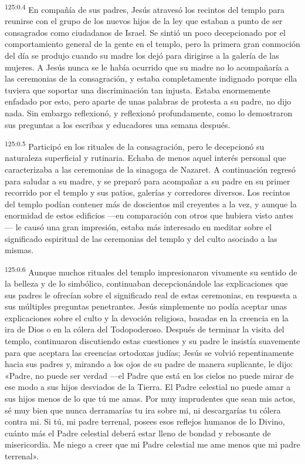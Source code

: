 \par 
\textsuperscript{125:0.4} En compañía de sus padres, Jesús atravesó los recintos del templo para reunirse con el grupo de los nuevos hijos de la ley que estaban a punto de ser consagrados como ciudadanos de Israel. Se sintió un poco decepcionado por el comportamiento general de la gente en el templo, pero la primera gran conmoción del día se produjo cuando su madre los dejó para dirigirse a la galería de las mujeres. A Jesús nunca se le había ocurrido que su madre no lo acompañaría a las ceremonias de la consagración, y estaba completamente indignado porque ella tuviera que soportar una discriminación tan injusta. Estaba enormemente enfadado por esto, pero aparte de unas palabras de protesta a su padre, no dijo nada. Sin embargo reflexionó, y reflexionó profundamente, como lo demostraron sus preguntas a los escribas y educadores una semana después.

\par 
\textsuperscript{125:0.5} Participó en los rituales de la consagración, pero le decepcionó su naturaleza superficial y rutinaria. Echaba de menos aquel interés personal que caracterizaba a las ceremonias de la sinagoga de Nazaret. A continuación regresó para saludar a su madre, y se preparó para acompañar a su padre en su primer recorrido por el templo y sus patios, galerías y corredores diversos. Los recintos del templo podían contener más de doscientos mil creyentes a la vez, y aunque la enormidad de estos edificios ---en comparación con otros que hubiera visto antes--- le causó una gran impresión, estaba más interesado en meditar sobre el significado espiritual de las ceremonias del templo y del culto asociado a las mismas.

\par 
\textsuperscript{125:0.6} Aunque muchos rituales del templo impresionaron vivamente su sentido de la belleza y de lo simbólico, continuaban decepcionándole las explicaciones que sus padres le ofrecían sobre el significado real de estas ceremonias, en respuesta a sus múltiples preguntas penetrantes. Jesús simplemente no podía aceptar unas explicaciones sobre el culto y la devoción religiosa, basadas en la creencia en la ira de Dios o en la cólera del Todopoderoso. Después de terminar la visita del templo, continuaron discutiendo estas cuestiones y su padre le insistía suavemente para que aceptara las creencias ortodoxas judías; Jesús se volvió repentinamente hacia sus padres y, mirando a los ojos de su padre de manera suplicante, le dijo: «Padre, no puede ser verdad ---el Padre que está en los cielos no puede mirar de ese modo a sus hijos desviados de la Tierra. El Padre celestial no puede amar a sus hijos menos de lo que tú me amas. Por muy imprudentes que sean mis actos, sé muy bien que nunca derramarías tu ira sobre mi, ni descargarías tu cólera contra mi. Si tú, mi padre terrenal, posees esos reflejos humanos de lo Divino, cuánto más el Padre celestial deberá estar lleno de bondad y rebosante de misericordia. Me niego a creer que mi Padre celestial me ame menos que mi padre terrenal».

